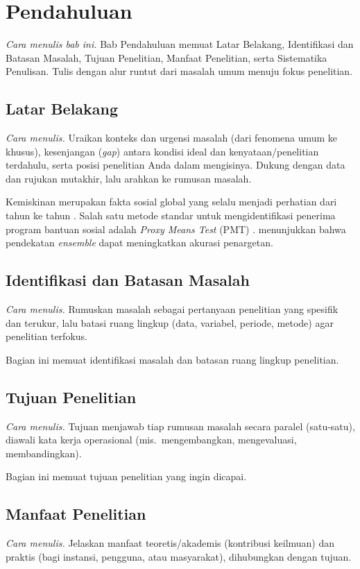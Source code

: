 \chapter{Pendahuluan}
\emph{Cara menulis bab ini.} Bab Pendahuluan memuat Latar Belakang, Identifikasi dan Batasan Masalah, Tujuan Penelitian, Manfaat Penelitian, serta Sistematika Penulisan. Tulis dengan alur runtut dari masalah umum menuju fokus penelitian.


\section{Latar Belakang}
\emph{Cara menulis.} Uraikan konteks dan urgensi masalah (dari fenomena umum ke khusus), kesenjangan (\emph{gap}) antara kondisi ideal dan kenyataan/penelitian terdahulu, serta posisi penelitian Anda dalam mengisinya. Dukung dengan data dan rujukan mutakhir, lalu arahkan ke rumusan masalah.

Kemiskinan merupakan fakta sosial global yang selalu menjadi perhatian dari tahun
ke tahun \parencite{megawati2021}. Salah satu metode standar untuk mengidentifikasi
penerima program bantuan sosial adalah \emph{Proxy Means Test} (PMT)
\parencite{etang2022}. \textcite{taufiq2021} menunjukkan bahwa pendekatan
\emph{ensemble} dapat meningkatkan akurasi penargetan.


\section{Identifikasi dan Batasan Masalah}
\emph{Cara menulis.} Rumuskan masalah sebagai pertanyaan penelitian yang spesifik dan terukur, lalu batasi ruang lingkup (data, variabel, periode, metode) agar penelitian terfokus.

Bagian ini memuat identifikasi masalah dan batasan ruang lingkup penelitian.

\section{Tujuan Penelitian}
\emph{Cara menulis.} Tujuan menjawab tiap rumusan masalah secara paralel (satu-satu), diawali kata kerja operasional (mis.\ mengembangkan, mengevaluasi, membandingkan).

Bagian ini memuat tujuan penelitian yang ingin dicapai.

\section{Manfaat Penelitian}
\emph{Cara menulis.} Jelaskan manfaat teoretis/akademis (kontribusi keilmuan) dan praktis (bagi instansi, pengguna, atau masyarakat), dihubungkan dengan tujuan.

